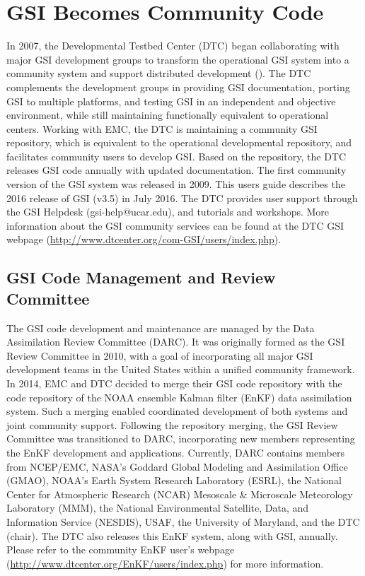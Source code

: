 \section{GSI Becomes Community Code}

In 2007, the Developmental Testbed Center (DTC) began collaborating with major GSI development groups to transform the operational GSI system into a community system and support distributed development (\cite{Shao2016}). The DTC complements the development groups in providing GSI documentation, porting GSI to multiple platforms, and testing GSI in an independent and objective environment, while still maintaining functionally equivalent to operational centers. Working with EMC, the DTC is maintaining a community GSI repository, which is equivalent to the operational developmental repository, and facilitates community users to develop GSI. Based on the repository, the DTC releases GSI code annually with updated documentation. The first community version of the GSI system was released in 2009. This user\textquotesingle s guide describes the 2016 release of GSI (v3.5) in July 2016. The DTC provides user support through the GSI Helpdesk (gsi-help@ucar.edu), and tutorials and workshops. More information about the GSI community services can be found at the DTC GSI webpage (\url{http://www.dtcenter.org/com-GSI/users/index.php}).

\subsection{GSI Code Management and Review Committee}
The GSI code development and maintenance are managed by the Data Assimilation Review Committee (DARC). It was originally formed as the GSI Review Committee in 2010, with a goal of incorporating all major GSI development teams in the United States within a unified community framework. In 2014, EMC and DTC decided to merge their GSI code repository with the code repository of the NOAA ensemble Kalman filter (EnKF) data assimilation system. Such a merging enabled coordinated development of both systems and joint community support. Following the repository merging, the GSI Review Committee was transitioned to DARC, incorporating new members representing the EnKF development and applications. Currently, DARC contains members from NCEP/EMC, NASA's Goddard Global Modeling and Assimilation Office (GMAO), NOAA's Earth System Research Laboratory (ESRL), the National Center for Atmospheric Research (NCAR) Mesoscale \& Microscale Meteorology Laboratory (MMM), the National Environmental Satellite, Data, and Information Service (NESDIS), USAF, the University of Maryland, and the DTC (chair). The DTC also releases this EnKF system, along with GSI, annually. Please refer to the community EnKF user's webpage (\url{http://www.dtcenter.org/EnKF/users/index.php}) for more information.

